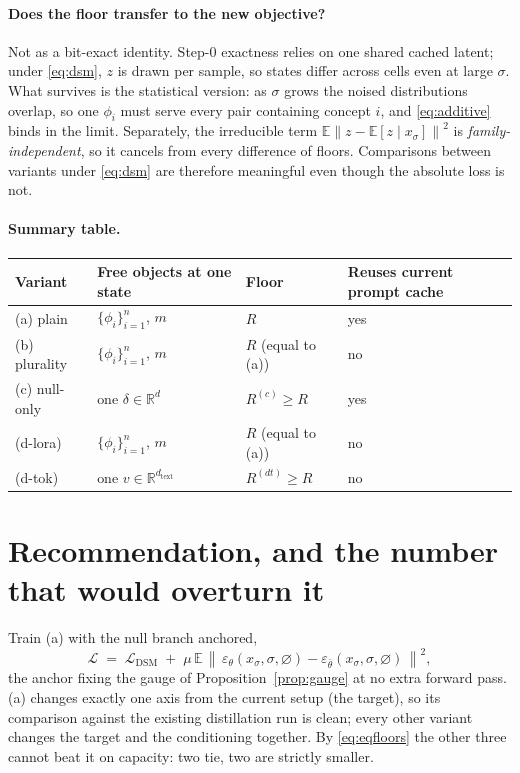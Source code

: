 \documentclass[11pt]{article}
\newcommand{\eps}{\varepsilon}
\newcommand{\epsth}{\eps_\theta}
\newcommand{\epsfr}{\eps_{\bar\theta}}
\newcommand{\xs}{x_\sigma}
\newcommand{\E}{\mathbb{E}}
\newcommand{\R}{\mathbb{R}}
\newcommand{\norm}[1]{\left\lVert #1 \right\rVert}
\newcommand{\cnull}{\varnothing}
\theoremstyle{plain}
\theoremstyle{remark}
\begin{document}
\paragraph{Does the floor transfer to the new objective?}
Not as a bit-exact identity. Step-0 exactness relies on one shared cached latent; under
\eqref{eq:dsm}, $z$ is drawn per sample, so states differ across cells even at large $\sigma$.
What survives is the statistical version: as $\sigma$ grows the noised distributions overlap,
so one $\phi_i$ must serve every pair containing concept $i$, and \eqref{eq:additive} binds in
the limit. Separately, the irreducible term $\E\norm{z - \E[z\mid\xs]}^2$ is
\emph{family-independent}, so it cancels from every difference of floors. Comparisons between
variants under \eqref{eq:dsm} are therefore meaningful even though the absolute loss is not.

\paragraph{Summary table.}
\begin{center}
\begin{tabular}{llll}
\toprule
Variant & Free objects at one state & Floor & Reuses current prompt cache \\
\midrule
(a) plain        & $\{\phi_i\}_{i=1}^{n}$, $m$        & $R$                 & yes \\
(b) plurality    & $\{\phi_i\}_{i=1}^{n}$, $m$        & $R$ (equal to (a))  & no \\
(c) null-only    & one $\delta \in \R^d$              & $R^{(c)} \ge R$     & yes \\
(d-lora)         & $\{\phi_i\}_{i=1}^{n}$, $m$        & $R$ (equal to (a))  & no \\
(d-tok)          & one $v \in \R^{d_\mathrm{text}}$   & $R^{(dt)} \ge R$    & no \\
\bottomrule
\end{tabular}
\end{center}

\section{Recommendation, and the number that would overturn it}

Train (a) with the null branch anchored,
\begin{equation}
  \mathcal{L} \;=\; \mathcal{L}_{\mathrm{DSM}}
  \;+\; \mu \, \E\,\norm{\,\epsth(\xs,\sigma,\cnull) - \epsfr(\xs,\sigma,\cnull)\,}^2 ,
  \label{eq:recommended}
\end{equation}
the anchor fixing the gauge of Proposition~\ref{prop:gauge} at no extra forward pass. (a)
changes exactly one axis from the current setup (the target), so its comparison against the
existing distillation run is clean; every other variant changes the target and the conditioning
together. By \eqref{eq:eqfloors} the other three cannot beat it on capacity: two tie, two are
strictly smaller.
\end{document}

